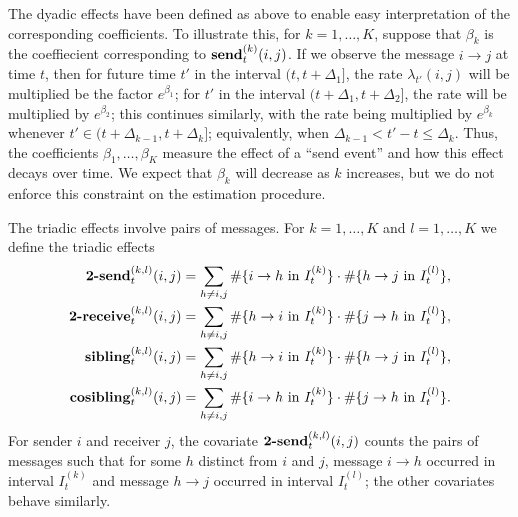 \documentclass[final]{statsoc}
\begin{document}
The dyadic effects have been defined as above to enable easy interpretation of
the corresponding coefficients.  To illustrate this, for $k = 1, \dotsc, K$,
suppose that $\beta_{k}$ is the coeffiecient corresponding to
$\text{\textbf{send}}^{(k)}_t(i,j)$.  If we observe the message $i \to j$ at
time $t$, then for future time $t'$ in the interval $(t, t + \Delta_1]$, the
rate $\lambda_{t'}(i,j)$ will be multiplied be the factor $e^{\beta_{1}}$; for
$t'$ in the interval $(t + \Delta_1, t + \Delta_2]$, the rate will be
multiplied by $e^{\beta_{2}}$; this continues similarly, with the rate being
multiplied by $e^{\beta_{k}}$ whenever $t' \in (t + \Delta_{k-1}, t +
\Delta_{k}]$; equivalently, when $\Delta_{k-1} < t' - t \leq \Delta_k$.  Thus,
the coefficients $\beta_{1}, \dotsc, \beta_{K}$ measure the effect of a ``send
event'' and how this effect decays over time.  We expect that $\beta_{k}$ will
decrease as $k$ increases, but we do not enforce this constraint on the
estimation procedure.  

The triadic effects involve pairs of messages.  For $k = 1, \dotsc, K$ and $l = 1, \dotsc, K$ we define the triadic effects
\begin{align*}
  \text{\textbf{2-send}}^{(k,l)}_t(i,j)
    &= \sum_{h \neq i,j} 
      \#\{ i \to h \text{ in } I_t^{(k)} \}
      \cdot \#\{ h \to j \text{ in } I_t^{(l)} \}, \\
  \text{\textbf{2-receive}}^{(k,l)}_t(i,j)
    &= \sum_{h \neq i,j} 
      \#\{ h \to i \text{ in } I_t^{(k)} \}
      \cdot \#\{ j \to h \text{ in } I_t^{(l)} \}, \\
  \text{\textbf{sibling}}^{(k,l)}_t(i,j)
    &= \sum_{h \neq i,j} 
      \#\{ h \to i \text{ in } I_t^{(k)} \}
      \cdot \#\{ h \to j \text{ in } I_t^{(l)} \}, \\
  \text{\textbf{cosibling}}^{(k,l)}_t(i,j)
    &= \sum_{h \neq i,j} 
      \#\{ i \to h \text{ in } I_t^{(k)} \}
      \cdot \#\{ j \to h \text{ in } I_t^{(l)} \}.
\end{align*}
For sender $i$ and receiver $j$, the covariate
$\text{\textbf{2-send}}^{(k,l)}_t(i,j)$ counts the pairs of messages such that for some $h$ distinct from $i$ and $j$, message $i \to h$ occurred in interval $I_t^{(k)}$ and message $h \to j$ occurred in interval $I_t^{(l)}$; the other covariates behave similarly.
\end{document}
